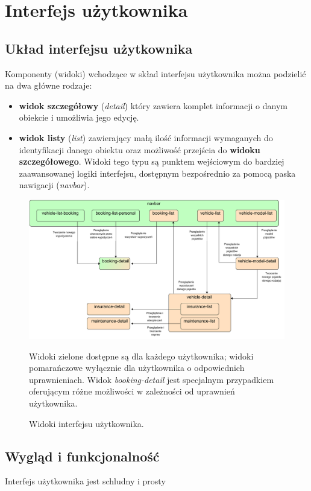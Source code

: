 \documentclass[eng,printmode,openany]{mgr}
\begin{document}
	
	\newpage
	
	
	
	\section{Interfejs użytkownika}
	\subsection{Układ interfejsu użytkownika}
	Komponenty (widoki) wchodzące w skład interfejsu użytkownika można podzielić na dwa główne rodzaje:
	\begin{itemize}
		\item \textbf{widok szczegółowy} (\textit{detail}) który zawiera komplet informacji o danym obiekcie i umożliwia jego edycję.
		\item \textbf{widok listy} (\textit{list}) zawierający małą ilość informacji wymaganych do identyfikacji danego obiektu oraz możliwość przejścia do \textbf{widoku szczegółowego}. Widoki tego typu są punktem wejściowym do bardziej zaawansowanej logiki interfejsu, dostępnym bezpośrednio za pomocą paska nawigacji (\textit{navbar}).
	\end{itemize}
	\begin{figure}[h]
		\centering
		\includegraphics[width=\textwidth]{images/angular_views.png}
		\caption{Widoki interfejsu użytkownika.}
		\small 
		Widoki zielone dostępne są dla każdego użytkownika; widoki pomarańczowe wyłącznie dla użytkownika o odpowiednich uprawnieniach. Widok \textit{booking-detail} jest specjalnym przypadkiem oferującym różne możliwości w zależności od uprawnień użytkownika.
	\end{figure}
	\subsection{Wygląd i funkcjonalność}
	Interfejs użytkownika jest schludny i prosty
	
\end{document}
